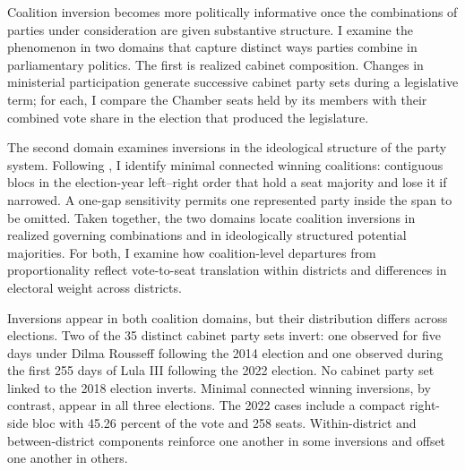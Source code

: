\documentclass[11pt]{article}
\begin{document}
Coalition inversion becomes more politically informative once the combinations
of parties under consideration are given substantive structure. I examine the
phenomenon in two domains that capture distinct ways parties combine in
parliamentary politics. The first is realized cabinet composition. Changes in
ministerial participation generate successive cabinet party sets during a
legislative term; for each, I compare the Chamber seats held by its members with
their combined vote share in the election that produced the legislature.

The second domain examines inversions in the ideological structure of the party
system. Following \textcite{axelrod1970conflict}, I identify minimal connected
winning coalitions: contiguous blocs in the election-year left--right order that
hold a seat majority and lose it if narrowed. A one-gap sensitivity permits one
represented party inside the span to be omitted. Taken together, the two domains
locate coalition inversions in realized governing combinations and in
ideologically structured potential majorities. For both, I examine how
coalition-level departures from proportionality reflect vote-to-seat translation
within districts and differences in electoral weight across districts.

Inversions appear in both coalition domains, but their distribution differs
across elections. Two of the 35 distinct cabinet party sets invert: one observed for five days
under Dilma Rousseff following the 2014 election and one observed during the first 255
days of Lula III following the 2022 election. No cabinet party set linked to
the 2018 election inverts. Minimal connected
winning inversions, by contrast, appear in all three elections. The 2022
cases include a compact right-side bloc with 45.26 percent of the vote and
258 seats. Within-district and between-district components reinforce one
another in some inversions and offset one another in others.

\end{document}
